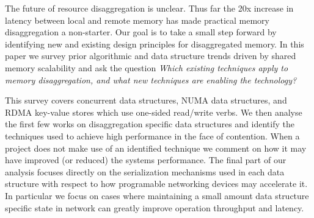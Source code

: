 
The future of resource disaggregation is unclear. Thus far the 20x increase in
latency between local and remote memory has made practical memory disaggregation
a non-starter. Our goal is to take a small step forward by
identifying new and existing design principles for disaggregated memory.
In this paper we survey prior algorithmic and data structure trends driven by
shared memory scalability and ask the question \textit{Which existing techniques
apply to memory disaggregation, and what new techniques are enabling the
technology?} 

This survey covers concurrent data structures, NUMA data
structures, and RDMA key-value stores which use one-sided read/write verbs.
We then analyse the first few works on disaggregation specific data structures
and identify the techniques used to achieve high performance in the face of
contention. When a project does not make use of an identified technique we
comment on how it may have improved (or reduced) the systems performance. The
final part of our analysis focuses directly on the serialization mechanisms used
in each data structure with respect to how programable networking devices may
accelerate it. In particular we focus on cases where maintaining a small amount
data structure specific state in network can greatly improve operation
throughput and latency.




